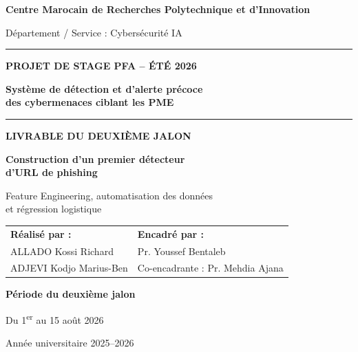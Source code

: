 \documentclass[11pt,a4paper]{report}
\begin{document}
\begin{titlepage}
  \centering
  {\large\bfseries Centre Marocain de Recherches Polytechnique et d'Innovation\par}
  \vspace{0.25cm}
  {\large Département / Service : Cybersécurité IA\par}
  \vspace{1.3cm}
  \rule{\textwidth}{1.2pt}
  \vspace{0.5cm}

  {\Large\bfseries PROJET DE STAGE PFA -- ÉTÉ 2026\par}
  \vspace{0.5cm}
  {\LARGE\bfseries\color{cmrpiblue}
  Système de détection et d'alerte précoce\\
  des cybermenaces ciblant les PME\par}

  \vspace{0.5cm}
  \rule{\textwidth}{1.2pt}
  \vspace{1.3cm}

  {\Large\bfseries LIVRABLE DU DEUXIÈME JALON\par}
  \vspace{0.7cm}
  {\LARGE\bfseries
  Construction d'un premier détecteur\\
  d'URL de phishing\par}
  \vspace{0.4cm}
  {\large Feature Engineering, automatisation des données\\
  et régression logistique\par}

  \vfill

  \begin{tabularx}{\textwidth}{X X}
    \textbf{Réalisé par :} & \textbf{Encadré par :}\\[0.25cm]
    ALLADO Kossi Richard & Pr. Youssef Bentaleb\\
    ADJEVI Kodjo Marius-Ben & Co-encadrante : Pr. Mehdia Ajana
  \end{tabularx}

  \vfill
  {\large\bfseries Période du deuxième jalon\par}
  {\large Du 1\textsuperscript{er} au 15 août 2026\par}
  \vspace{0.7cm}
  {\large Année universitaire 2025--2026\par}
\end{titlepage}
\end{document}
